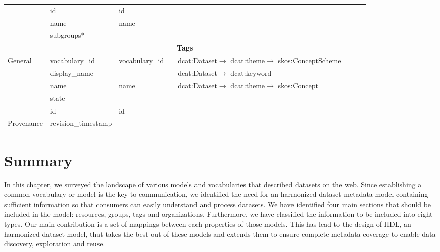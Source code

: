 \begin{landscape}
{\begin{longtable}{|p{1cm}|m{3.1cm}|m{2.4cm}|m{2.5cm}|p{3.8cm}|m{3.8cm}|m{5.55cm}|m{2.5cm}|}
\cline{2-8}
 & id & id &  &  &  &  & \tabularnewline
\cline{2-8}
 & name & name &  &  &  &  & \tabularnewline
\cline{2-8}
 & subgroups$\ast$ &  &  &  &  &  & \tabularnewline
\hline
\multicolumn{8}{|c|}{\cellcolor{blue!25}\textbf{Tags}}\tabularnewline
\hline
\multirow{5}{2cm}{General} & vocabulary\_id & vocabulary\_id &  & dcat:Dataset$\rightarrow$ dcat:theme$\rightarrow$ skos:ConceptScheme &  &  & \tabularnewline
\cline{2-8}
 & display\_name &  &  & dcat:Dataset$\rightarrow$ dcat:keyword &  &  & \tabularnewline
\cline{2-8}
 & name & name &  & dcat:Dataset$\rightarrow$ dcat:theme$\rightarrow$ skos:Concept &  &  & \tabularnewline
\cline{2-8}
 & state &  &  &  &  &  & \tabularnewline
\cline{2-8}
 & id & id &  &  &  &  & \tabularnewline
\hline
Provenance & revision\_timestamp &  &  &  &  &  & \tabularnewline
\hline
\end{longtable}
}
\end{landscape}

\restoregeometry
\pagestyle{standard}

\section{Summary}
\label{sec:hdl_summary}
In this chapter, we surveyed the landscape of various models and vocabularies that described datasets on the web. Since establishing a common vocabulary or model is the key to communication, we identified the need for an harmonized dataset metadata model containing sufficient information so that consumers can easily understand and process datasets. We have identified four main sections that should be included in the model: resources, groups, tags and organizations. Furthermore, we have classified the information to be included into eight types. Our main contribution is a set of mappings between each properties of those models. This has lead to the design of HDL, an harmonized dataset model, that takes the best out of these models and extends them to ensure complete metadata coverage to enable data discovery, exploration and reuse.